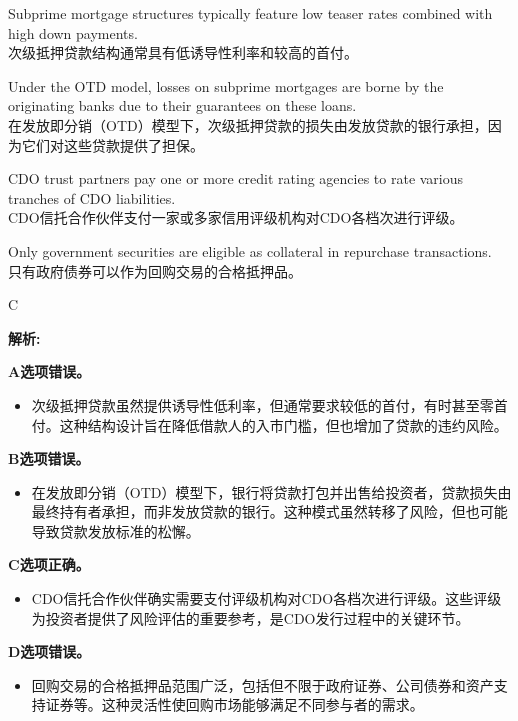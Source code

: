 \documentclass{article}
\newenvironment{explanation}
{\textbf{解析:}\par}
{\par}
\begin{document}
\begin{choices}
    \item Subprime mortgage structures typically feature low teaser rates combined with high down payments.\\
    次级抵押贷款结构通常具有低诱导性利率和较高的首付。
    \item Under the OTD model, losses on subprime mortgages are borne by the originating banks due to their guarantees on these loans.\\
    在发放即分销（OTD）模型下，次级抵押贷款的损失由发放贷款的银行承担，因为它们对这些贷款提供了担保。
    \item CDO trust partners pay one or more credit rating agencies to rate various tranches of CDO liabilities.\\
    CDO信托合作伙伴支付一家或多家信用评级机构对CDO各档次进行评级。
    \item Only government securities are eligible as collateral in repurchase transactions.\\
    只有政府债券可以作为回购交易的合格抵押品。
\end{choices}

\begin{correctanswer}
    C
\end{correctanswer}

\begin{explanation}
    \textbf{A选项错误。}
    \begin{itemize}
        \item 次级抵押贷款虽然提供诱导性低利率，但通常要求较低的首付，有时甚至零首付。这种结构设计旨在降低借款人的入市门槛，但也增加了贷款的违约风险。
    \end{itemize}

    \textbf{B选项错误。}
    \begin{itemize}
        \item 在发放即分销（OTD）模型下，银行将贷款打包并出售给投资者，贷款损失由最终持有者承担，而非发放贷款的银行。这种模式虽然转移了风险，但也可能导致贷款发放标准的松懈。
    \end{itemize}

    \textbf{C选项正确。}
    \begin{itemize}
        \item CDO信托合作伙伴确实需要支付评级机构对CDO各档次进行评级。这些评级为投资者提供了风险评估的重要参考，是CDO发行过程中的关键环节。
    \end{itemize}

    \textbf{D选项错误。}
    \begin{itemize}
        \item 回购交易的合格抵押品范围广泛，包括但不限于政府证券、公司债券和资产支持证券等。这种灵活性使回购市场能够满足不同参与者的需求。
    \end{itemize}
\end{explanation}
\end{document}

